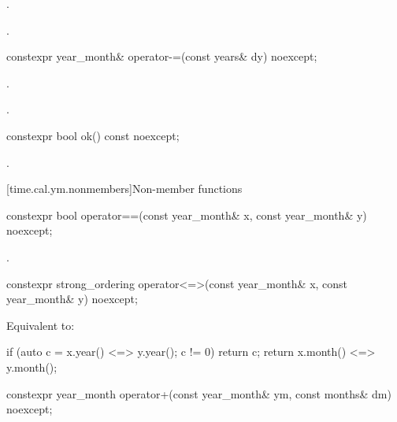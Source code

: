 \begin{itemdescr}
\pnum
\effects
{}.

\pnum
\returns
{}.
\end{itemdescr}

%
\begin{itemdecl}
constexpr year_month& operator-=(const years& dy) noexcept;
\end{itemdecl}

\begin{itemdescr}
\pnum
\effects
{}.

\pnum
\returns
{}.
\end{itemdescr}

%
\begin{itemdecl}
constexpr bool ok() const noexcept;
\end{itemdecl}

\begin{itemdescr}
\pnum
\returns
{}.
\end{itemdescr}

[time.cal.ym.nonmembers]{Non-member functions}

%
\begin{itemdecl}
constexpr bool operator==(const year_month& x, const year_month& y) noexcept;
\end{itemdecl}

\begin{itemdescr}
\pnum
\returns
{}.
\end{itemdescr}

%
\begin{itemdecl}
constexpr strong_ordering operator<=>(const year_month& x, const year_month& y) noexcept;
\end{itemdecl}

\begin{itemdescr}
\pnum
\effects
Equivalent to:
\begin{codeblock}
if (auto c = x.year() <=> y.year(); c != 0) return c;
return x.month() <=> y.month();
\end{codeblock}
\end{itemdescr}

%
\begin{itemdecl}
constexpr year_month operator+(const year_month& ym, const months& dm) noexcept;
\end{itemdecl}

